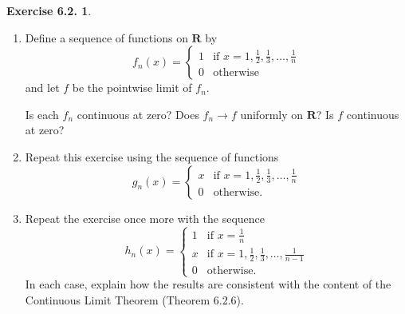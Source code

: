 \documentclass[12pt]{article}
\theoremstyle{definition}
\theoremstyle{exercise}
\newtheorem{exercise}{Exercise 6.2.}
\theoremstyle{solution}
\newcommand{\R}{\mathbf{R}}
\begin{document}
\begin{exercise}
\label{ex:2}
    \begin{enumerate}
        \item Define a sequence of functions on \( \R \) by
        \[
            f_n(x) = \begin{cases}
                1 & \text{if } x = 1, \tfrac{1}{2}, \tfrac{1}{3}, \ldots, \tfrac{1}{n} \\
                0 & \text{otherwise}
            \end{cases}
        \]
        and let \( f \) be the pointwise limit of \( f_n \).

        Is each \( f_n \) continuous at zero? Does \( f_n \to f \) uniformly on \( \R \)? Is \( f \) continuous at zero?

        \item Repeat this exercise using the sequence of functions
        \[
            g_n(x) = \begin{cases}
                x & \text{if } x = 1, \tfrac{1}{2}, \tfrac{1}{3}, \ldots, \tfrac{1}{n} \\
                0 & \text{otherwise}.
            \end{cases}
        \]

        \item Repeat the exercise once more with the sequence
        \[
            h_n(x) = \begin{cases}
                1 & \text{if } x = \tfrac{1}{n} \\
                x & \text{if } x = 1, \tfrac{1}{2}, \tfrac{1}{3}, \ldots, \tfrac{1}{n - 1} \\
                0 & \text{otherwise}.
            \end{cases}
        \]
        In each case, explain how the results are consistent with the content of the Continuous Limit Theorem (Theorem 6.2.6).
    \end{enumerate}
\end{exercise}
\end{document}
